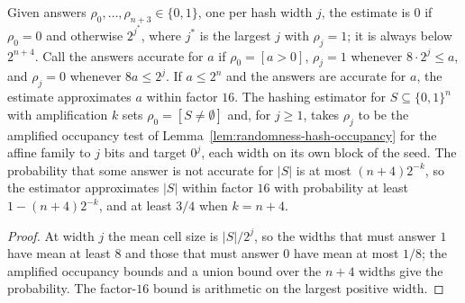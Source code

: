 \begin{lemma}
  \label{lem:randomness-weak-count}
  \leanok
  Given answers $\rho_0, \dots, \rho_{n+3} \in \{0,1\}$, one per hash width
  $j$, the estimate is $0$ if $\rho_0 = 0$ and otherwise $2^{j^*}$, where $j^*$
  is the largest $j$ with $\rho_j = 1$; it is always below $2^{n+4}$. Call the
  answers accurate for $a$ if $\rho_0 = [a > 0]$, $\rho_j = 1$ whenever
  $8 \cdot 2^j \le a$, and $\rho_j = 0$ whenever $8a \le 2^j$. If
  $a \le 2^n$ and the answers are accurate for $a$, the estimate approximates
  $a$ within factor $16$. The hashing estimator for $S \subseteq \{0,1\}^n$
  with amplification $k$ sets $\rho_0 = [S \neq \emptyset]$ and, for
  $j \ge 1$, takes $\rho_j$ to be the amplified occupancy test of
  Lemma~\ref{lem:randomness-hash-occupancy} for the affine family to $j$ bits
  and target $0^j$, each width on its own block of the seed. The probability
  that some answer is not accurate for $|S|$ is at most $(n + 4)2^{-k}$, so the
  estimator approximates $|S|$ within factor $16$ with probability at least
  $1 - (n + 4)2^{-k}$, and at least $3/4$ when $k = n + 4$.
\end{lemma}
\begin{proof}
  \leanok
  At width $j$ the mean cell size is $|S|/2^j$, so the widths that must answer
  $1$ have mean at least $8$ and those that must answer $0$ have mean at most
  $1/8$; the amplified occupancy bounds and a union bound over the $n + 4$
  widths give the probability. The factor-$16$ bound is arithmetic on the
  largest positive width.
\end{proof}

